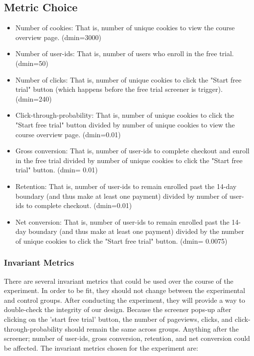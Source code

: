\documentclass[paper=a4, fontsize=11pt]{scrartcl} %
\numberwithin{equation}{section} %
\numberwithin{figure}{section} %
\numberwithin{table}{section} %
\begin{document}

\subsection{Metric Choice}

\begin{itemize}
	\item Number of cookies: That is, number of unique cookies to view the course overview page. (dmin=3000)
	\item Number of user-ids: That is, number of users who enroll in the free trial. (dmin=50)
	\item Number of clicks: That is, number of unique cookies to click the "Start free trial" button (which happens before the free trial screener is trigger). (dmin=240)
	\item Click-through-probability: That is, number of unique cookies to click the "Start free trial" button divided by number of unique cookies to view the course overview page. (dmin=0.01)
	\item Gross conversion: That is, number of user-ids to complete checkout and enroll in the free trial divided by number of unique cookies to click the "Start free trial" button. (dmin= 0.01)
	\item Retention: That is, number of user-ids to remain enrolled past the 14-day boundary (and thus make at least one payment) divided by number of user-ids to complete checkout. (dmin=0.01)
	\item Net conversion: That is, number of user-ids to remain enrolled past the 14-day boundary (and thus make at least one payment) divided by the number of unique cookies to click the "Start free trial" button. (dmin= 0.0075) \newline
\end{itemize}


\subsubsection{Invariant Metrics}

There are several invariant metrics that could be used over the course of the experiment.  In order to be fit, they should not change between the experimental and control groups.  After conducting the experiment, they will provide a way to double-check the integrity of our design.  Because the screener pops-up after clicking on the 'start free trial' button, the number of pageviews, clicks, and click-through-probability should remain the same across groups.  Anything after the screener; number of user-id\textquotesingle s, gross conversion, retention, and net conversion could be affected.  The invariant metrics chosen for the experiment are:
\end{document}
